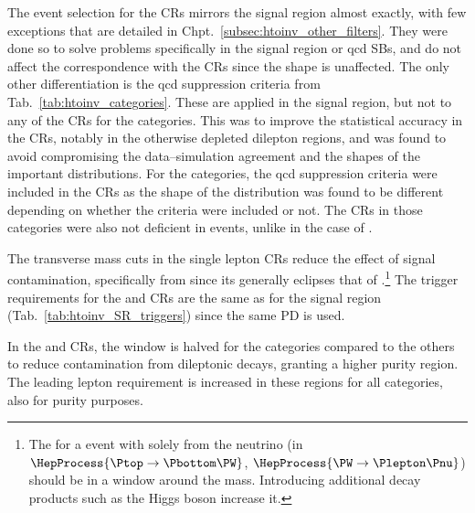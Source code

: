 \noindent{}The event selection for the \glspl{CR} mirrors the signal region almost exactly, with few exceptions that are detailed in Chpt.~\ref{subsec:htoinv_other_filters}. They were done so to solve problems specifically in the signal region or \acrshort{qcd} \glspl{SB}, and do not affect the correspondence with the \glspl{CR} since the \ptmiss shape is unaffected. The only other differentiation is the \acrshort{qcd} suppression criteria from Tab.~\ref{tab:htoinv_categories}. These are applied in the signal region, but not to any of the \glspl{CR} for the \ttH categories. This was to improve the statistical accuracy in the \glspl{CR}, notably in the otherwise depleted dilepton regions, and was found to avoid compromising the data--simulation agreement and the shapes of the important distributions. For the \VH categories, the \acrshort{qcd} suppression criteria were included in the \glspl{CR} as the shape of the \ptmiss distribution was found to be different depending on whether the criteria were included or not. The \glspl{CR} in those categories were also not deficient in events, unlike in the case of \ttH.

The transverse mass cuts in the single lepton \glspl{CR} reduce the effect of signal contamination, specifically from \ttH since its \mT generally eclipses that of \ttbar.\footnote{The \mT for a \ttbar event with \ptvecmiss solely from the neutrino (in $\HepProcess{\Ptop \to \Pbottom\PW}$, $\HepProcess{\PW \to \Plepton\Pnu}$) should be in a window around the \PW mass. Introducing additional decay products such as the Higgs boson increase it.} The trigger requirements for the \singleMuCr and \doubleMuCr \glspl{CR} are the same as for the signal region (Tab.~\ref{tab:htoinv_SR_triggers}) since the same \gls{PD} is used.

In the \doubleMuCr and \doubleEleCr \glspl{CR}, the \doubleLepMass window is halved for the \ttH categories compared to the others to reduce contamination from dileptonic \ttbar decays, granting a higher purity \ztolplmpjets region. The leading lepton \pt requirement is increased in these regions for all categories, also for purity purposes.

